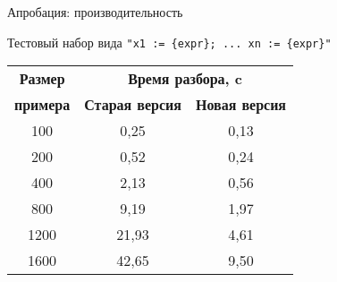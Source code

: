 \documentclass[10pt, mathserif]{beamer}
\let\\\tabularnewline
\let\\\tabularnewline
\theoremstyle{definition}
\begin{document}
\begin{frame}[fragile]{Апробация: производительность}

Тестовый набор вида \lstinline|"x1 := {expr}; ... xn := {expr}"|
\vskip3mm

  \begin{table}[htbp]
  \begin{center}
  \begin{tabular}{|c|c|c|}
  \hline
  \textbf{Размер} & \multicolumn{2}{|c|}{\textbf{Время разбора, c}} \\
  \cline{2-3}
  \textbf{примера} & \textbf{Старая версия} & \textbf{Новая версия} \\
  \hline
  100& 0,25& 0,13 \\
  \hline
  200& 0,52& 0,24 \\
  \hline
  400& 2,13& 0,56 \\
  \hline
  800& 9,19& 1,97 \\
  \hline
  1200& 21,93& 4,61 \\
  \hline
  1600& 42,65& 9,50 \\
  \hline
  \end{tabular}
  \vskip3mm
  \label{tab1}
  \end{center}\vspace{-10mm}
  \end{table}

\end{frame}
\end{document}
